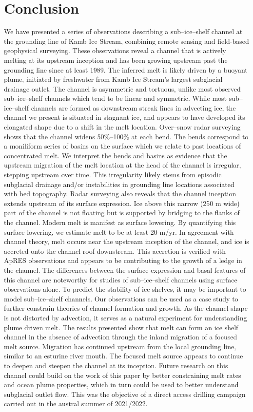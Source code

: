 \section{Conclusion} \label{sec:conclusion}
We have presented a series of observations describing a sub--ice--shelf channel at the grounding line of Kamb Ice Stream, combining remote sensing and field-based geophysical surveying. 
These observations reveal a channel that is actively melting at its upstream inception and has been growing upstream past the grounding line since at least 1989.
The inferred melt is likely driven by a buoyant plume, initiated by freshwater from Kamb Ice Stream's largest subglacial drainage outlet.
The channel is asymmetric and tortuous, unlike most observed sub--ice--shelf channels which tend to be linear and symmetric. While most sub--ice--shelf channels are formed as downstream streak lines in advecting ice, the channel we present is situated in stagnant ice, and appears to have developed its elongated shape due to a shift in the melt location. Over--snow radar surveying shows that the channel widens 50\%--100\% at each bend. The bends correspond to a moniliform series of basins on the surface which we relate to past locations of concentrated melt. 
We interpret the bends and basins as evidence that the upstream migration of the melt location at the head of the channel is irregular, stepping upstream over time. 
This irregularity likely stems from episodic subglacial drainage and/or instabilities in grounding line locations associated with bed topography. Radar surveying also reveals that the channel inception extends upstream of its surface expression. 
Ice above this narrow (250 m wide) part of the channel is not floating but is supported by bridging to the flanks of the channel. 
Modern melt is manifest as surface lowering. By quantifying this surface lowering, we estimate melt to be at least 20 m/yr. In agreement with channel theory, melt occurs near the upstream inception of the channel, and ice is accreted onto the channel roof downstream. This accretion is verified with ApRES observations and appears to be contributing to the growth of a ledge in the channel. The differences between the surface expression and basal features of this channel are noteworthy for studies of sub--ice--shelf channels using surface observations alone. To predict the stability of ice shelves, it may be important to model sub--ice--shelf channels. Our observations can be used as a case study to further constrain theories of channel formation and growth. As the channel shape is not distorted by advection, it serves as a natural experiment for understanding plume driven melt.
The results presented show that melt can form an ice shelf channel in the absence of advection through the inland migration of a focused melt source. Migration has continued upstream from the local grounding line, similar to an esturine river mouth. The focused melt source appears to continue to deepen and steepen the channel at its inception.
Future research on this channel could build on the work of this paper by better constraining melt rates and ocean plume properties, which in turn could be used to better understand subglacial outlet flow. This was the objective of a direct access drilling campaign carried out in the austral summer of 2021/2022.


